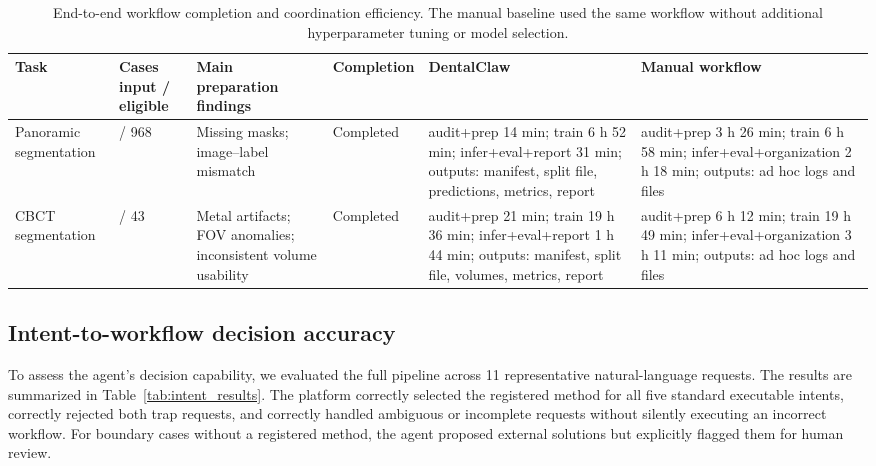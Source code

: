 \documentclass[final,5p,times,twocolumn]{elsarticle}
\begin{document}
\begin{table}[!t]
\centering
\small
\setlength{\tabcolsep}{4pt}
\renewcommand{\arraystretch}{1.12}
\caption{End-to-end workflow completion and coordination efficiency. The manual baseline used the same workflow without additional hyperparameter tuning or model selection.}
\label{tab:workflow_validation}
\begin{threeparttable}
\begin{tabularx}{\textwidth}{>{\raggedright\arraybackslash}p{2.3cm}>{\centering\arraybackslash}p{1.6cm}>{\raggedright\arraybackslash}p{3.0cm}>{\centering\arraybackslash}p{1.4cm}>{\raggedright\arraybackslash}X>{\raggedright\arraybackslash}X}
\toprule
Task & Cases input / eligible & Main preparation findings & Completion & DentalClaw & Manual workflow \\
\midrule
Panoramic segmentation & 1051 / 968 & Missing masks; image--label mismatch & Completed & audit+prep 14 min; train 6 h 52 min; infer+eval+report 31 min; outputs: manifest, split file, predictions, metrics, report & audit+prep 3 h 26 min; train 6 h 58 min; infer+eval+organization 2 h 18 min; outputs: ad hoc logs and files \\
\addlinespace
CBCT segmentation & 63 / 43 & Metal artifacts; FOV anomalies; inconsistent volume usability & Completed & audit+prep 21 min; train 19 h 36 min; infer+eval+report 1 h 44 min; outputs: manifest, split file, volumes, metrics, report & audit+prep 6 h 12 min; train 19 h 49 min; infer+eval+organization 3 h 11 min; outputs: ad hoc logs and files \\
\bottomrule
\end{tabularx}
\end{threeparttable}
\end{table}

\subsection{Intent-to-workflow decision accuracy}
To assess the agent's decision capability, we evaluated the full pipeline across 11 representative natural-language requests. The results are summarized in Table~\ref{tab:intent_results}. The platform correctly selected the registered method for all five standard executable intents, correctly rejected both trap requests, and correctly handled ambiguous or incomplete requests without silently executing an incorrect workflow. For boundary cases without a registered method, the agent proposed external solutions but explicitly flagged them for human review.
\end{document}
